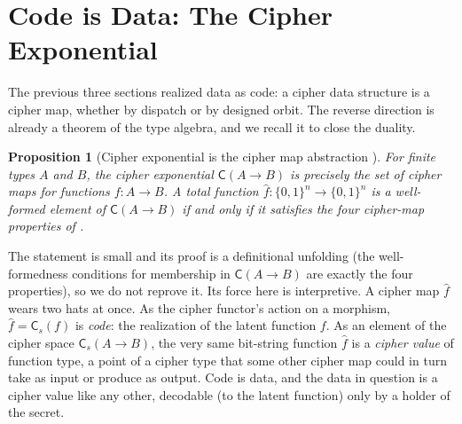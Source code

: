 \documentclass[11pt]{article}
\theoremstyle{definition}
\theoremstyle{plain}
\newtheorem{proposition}[theorem]{Proposition}
\theoremstyle{definition}
\theoremstyle{remark}
\newcommand{\fhat}{\hat{f}}
\newcommand{\cipher}[1]{\mathsf{C}(#1)}
\newcommand{\cipherS}[2]{\mathsf{C}_{#2}(#1)}
\newcommand{\B}{\{0,1\}}
\begin{document}
\section{Code is Data: The Cipher Exponential}
\label{sec:exponential}

The previous three sections realized data as code: a cipher data
structure is a cipher map, whether by dispatch or by designed orbit.
The reverse direction is already a theorem of the type algebra, and we
recall it to close the duality.

\begin{proposition}[Cipher exponential is the cipher map abstraction
{\cite[Prop.~4.3]{towell2026algebraic}}]
\label{prop:exponential}
For finite types $A$ and $B$, the cipher exponential $\cipher{A \to B}$
is precisely the set of cipher maps for functions $f : A \to B$. A
total function $\fhat : \B^n \to \B^n$ is a well-formed element of
$\cipher{A \to B}$ if and only if it satisfies the four cipher-map
properties of .
\end{proposition}

The statement is small and its proof is a definitional unfolding (the
well-formedness conditions for membership in $\cipher{A \to B}$ are
exactly the four properties), so we do not reprove it. Its force here
is interpretive. A cipher map $\fhat$ wears two hats at once. As the
cipher functor's action on a morphism, $\fhat = \cipherS{f}{s}$ is
\emph{code}: the realization of the latent function $f$. As an element
of the cipher space $\cipherS{A \to B}{s}$, the very same bit-string
function $\fhat$ is a \emph{cipher value} of function type, a point of
a cipher type that some other cipher map could in turn take as input or
produce as output. Code is data, and the data in question is a cipher
value like any other, decodable (to the latent function) only by a
holder of the secret.
\end{document}
